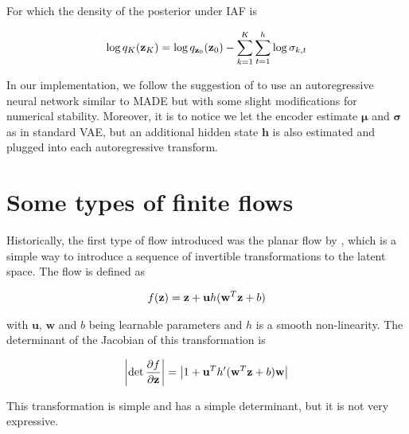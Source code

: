 \documentclass[12pt]{article}
\begin{document}
For which the density of the posterior under IAF is

\begin{equation}
    \log q_K(\textbf{z}_K) = \log q_{\textbf{z}_0}(\textbf{z}_0) - \sum_{k=1}^K \sum_{t=1}^h \log \sigma_{k,t}
\end{equation}

In our implementation, we follow the suggestion of \cite{Kingma2016ImprovedVI} to use an autoregressive neural network similar to MADE \cite{pmlr-v37-germain15} but with some slight modifications for numerical stability.
Moreover, it is to notice we let the encoder estimate \(\boldsymbol{\mu}\) and \(\boldsymbol{\sigma}\) as in standard VAE, but an additional hidden state \(\mathbf{h}\) is also estimated and plugged into each autoregressive transform. 

\section{Some types of finite flows}

Historically, the first type of flow introduced was the planar flow by \cite{Mohamed2015VariationalIM}, which is a simple way to introduce a sequence of invertible transformations to the latent space. The flow is defined as

\begin{align}
    f(\textbf{z}) = \textbf{z} + \mathbf{u}h(\mathbf{w}^T\textbf{z} + b)
\end{align}

with \(\mathbf{u}\), \(\mathbf{w}\) and \(b\) being learnable parameters and \(h\) is a smooth non-linearity. The determinant of the Jacobian of this transformation is

\begin{align}
    \left| \det \frac{\partial f}{\partial \textbf{z}} \right| = \left| 1 + \mathbf{u}^T h'(\mathbf{w}^T\textbf{z} + b)\mathbf{w} \right|
\end{align}

This transformation is simple and has a simple determinant, but it is not very expressive. 




\end{document}
